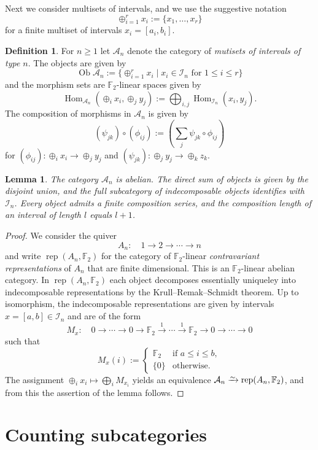 \documentclass[a4paper]{amsart}
\theoremstyle{plain}
\newtheorem{lem}[thm]{Lemma}
\theoremstyle{definition}
\newtheorem{defn}[thm]{Definition}
\theoremstyle{remark}
\numberwithin{equation}{section}
\newcommand{\Hom}{\operatorname{Hom}}
\newcommand{\Ob}{\operatorname{Ob}}
\newcommand{\rep}{\operatorname{rep}}
\newcommand{\iso}{\xrightarrow{\raisebox{-.4ex}[0ex][0ex]{$\scriptstyle{\sim}$}}}
\newcommand{\lto}{\longrightarrow}
\newcommand{\xto}{\xrightarrow}
\def\A{\mathcal A}
\def\I{\mathcal I}
\def\bbF{\mathbb F}
\begin{document}
Next we consider multisets of intervals, and we use the suggestive
notation
\[\oplus_{i=1}^r x_i:=\{x_1,\ldots,x_r\}\]
for a finite multiset of intervals $x_i=[a_i,b_i]$.

\begin{defn}\label{de:intervals}
  For $n\ge 1$ let $\A_n$ denote the category of \emph{mutisets of
  intervals of type $n$}. The objects are given by
\[\Ob\A_n:=\{\oplus_{i=1}^r x_i\mid x_i\in\I_n\text{ for }1\le
  i\le r\}\]
and the morphism sets are $\bbF_2$-linear spaces given by 
\[\Hom_{\A_n}(\oplus_i x_i, \oplus_j y_j):=\bigoplus_{i,j}\Hom_{\I_n}(x_i,y_j).\]
The composition of morphisms in $\A_n$ is given by
\[(\psi_{jk})\circ(\phi_{ij}):=\left(\sum_j\psi_{jk}\circ\phi_{ij}\right)\]
  for $(\phi_{ij})\colon \oplus_i x_i\to \oplus_j y_j$ and
  $(\psi_{jk})\colon \oplus_j y_j\to \oplus_k z_k$.
\end{defn}

\begin{lem}\label{le:repAn}
  The category $\A_n$ is abelian. The direct sum of objects is given
  by the disjoint union, and the full subcategory of indecomposable
  objects identifies with $\I_n$.  Every object admits a finite
  composition series, and the composition length of an interval of
  length $l$ equals $l+1$.
\end{lem}
\begin{proof}
We consider the quiver
\[A_n\colon\quad 1\lto 2\lto\cdots\lto n\] and write
$\rep(A_n,\bbF_2)$ for the category of $\bbF_2$-linear
\emph{contravariant representations} of $A_n$ that are finite
dimensional.  This is an $\bbF_2$-linear abelian category. In $\rep(A_n,\bbF_2)$ each object
decomposes essentially uniqueley into indecomposable representations
by the Krull--Remak--Schmidt theorem.
Up to isomorphism, the indecomposable representations are given by
intervals $x=[a,b]\in\I_n$ and are of the form
\[M_x\colon \quad 0\lto\cdots \lto 0\lto \bbF_2\xto{\ 1\ }\cdots\xto{\ 1\
  }\bbF_2\lto 0\lto\cdots\lto 0\] such that
\[M_x(i):=\begin{cases} \bbF_2&\text{if }a\le i\le b,\\
    \{0\}& \text{otherwise}.
  \end{cases}\]
The assignment $\oplus_i x_i\mapsto \bigoplus_i M_{x_i}$ yields an equivalence $\A_n\iso
\rep(A_n,\bbF_2)$, and from this the assertion of the lemma follows.
\end{proof}

\section{Counting subcategories}
\end{document}
